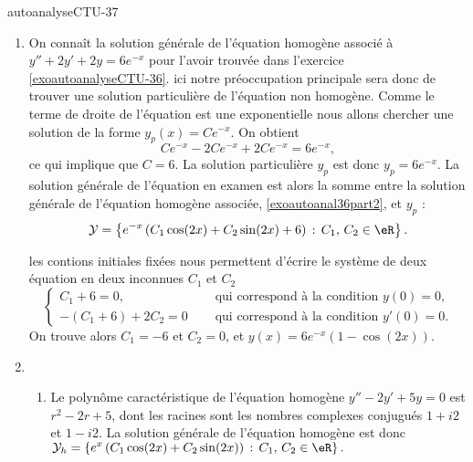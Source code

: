 
\begin{corrige}{autoanalyseCTU-37}

  \begin{enumerate}
  \item On connaît la solution générale de l'équation homogène associé à $y''+2y'+2y=6e^{-x}$ pour l'avoir trouvée dans l'exercice \ref{exoautoanalyseCTU-36}. ici notre préoccupation principale sera donc de trouver une solution particulière de l'équation non homogène. Comme le terme de droite de l'équation est une exponentielle nous allons chercher une solution de la forme $y_p(x) =Ce^{-x} $. On obtient 
    \begin{equation*}
      Ce^{-x} -2Ce^{-x}+2Ce^{-x} = 6e^{-x}, 
    \end{equation*}
    ce qui implique que $C = 6$. La solution particulière $y_p$ est donc $y_p = 6 e^{-x}$. La solution générale de l'équation en examen est alors la somme entre la solution générale de l'équation homogène associée, \eqref{exoautoanal36part2}, et $y_p$ : 
    \begin{equation*}
      \mathcal{Y}  = \left\{ e^{-x}\left(C_1\cos(2x) +C_2\sin(2x)+ 6\right)  \,:\, C_1,\, C_2 \in \eR \right\}.
    \end{equation*} 

les contions initiales fixées nous permettent d'écrire le système de deux équation en deux inconnues $C_1$ et $C_2$ 
\begin{equation*}
  \begin{cases}
    C_1+6= 0,  & \quad\text{ qui correspond à la condition }y(0)=0,\\
    -(C_1+6) + 2C_2 = 0 & \quad\text{ qui correspond à la condition }y'(0)=0.
  \end{cases}
\end{equation*}
On trouve alors $C_1 = -6$ et $C_2 = 0$, et $y(x) = 6e^{-x}\left(1-\cos(2x)\right)$.
   \item \begin{enumerate}
  \item Le polyn\^ome caractéristique de l'équation homogène $y''-2y'+5y=0$ est $r^2-2r+5$, dont les racines sont les nombres complexes conjugués $1+i2$ et $1-i2$. La solution générale de l'équation homogène est donc $\displaystyle \mathcal{Y}_h  = \left\{ e^{x}\left(C_1\cos(2x) +C_2\sin(2x)\right)  \,:\, C_1,\, C_2 \in \eR \right\}.$


\end{enumerate}
\end{enumerate}
\end{corrige}
